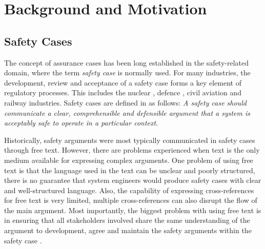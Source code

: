 \section{Background and Motivation}
\label{sec:background}

\subsection{Safety Cases}
The concept of assurance cases has been long established in the safety-related domain, where the term \textit{safety case} is normally used. 
For many industries, the development, review and acceptance of a safety case forms a key element of regulatory processes. This includes the nuclear \cite{hse}, defence \cite{mod2007}, civil aviation \cite{caa2007} and railway \cite{yellowBook2007} industries. Safety cases are defined in \cite{kelly2004goal} as follows: \textit{A safety case should communicate a clear, comprehensible and defensible argument that a system is acceptably safe to operate in a particular context}. 

Historically, safety arguments were most typically communicated in safety cases through free text. However, there are problems experienced when text is the only medium available for expressing complex arguments. One problem of using free text is that the language used in the text can be unclear and poorly structured, there is no guarantee that system engineers would produce safety cases with clear and well-structured language. Also, the capability of expressing cross-references for free text is very limited, multiple cross-references can also disrupt the flow of the main argument. Most importantly, the biggest problem with using free text is in ensuring that all stakeholders involved share the same understanding of the argument to development, agree and maintain the safety arguments within the safety case \cite{kelly2004goal}.

